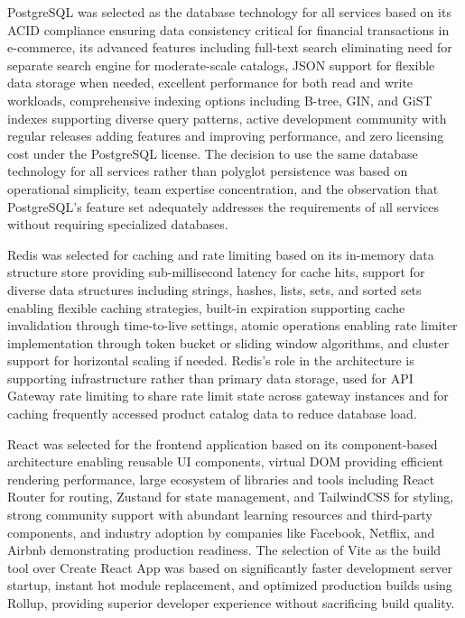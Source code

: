 PostgreSQL was selected as the database technology for all services based on its ACID compliance ensuring data consistency critical for financial transactions in e-commerce, its advanced features including full-text search eliminating need for separate search engine for moderate-scale catalogs, JSON support for flexible data storage when needed, excellent performance for both read and write workloads, comprehensive indexing options including B-tree, GIN, and GiST indexes supporting diverse query patterns, active development community with regular releases adding features and improving performance, and zero licensing cost under the PostgreSQL license. The decision to use the same database technology for all services rather than polyglot persistence was based on operational simplicity, team expertise concentration, and the observation that PostgreSQL's feature set adequately addresses the requirements of all services without requiring specialized databases.

Redis was selected for caching and rate limiting based on its in-memory data structure store providing sub-millisecond latency for cache hits, support for diverse data structures including strings, hashes, lists, sets, and sorted sets enabling flexible caching strategies, built-in expiration supporting cache invalidation through time-to-live settings, atomic operations enabling rate limiter implementation through token bucket or sliding window algorithms, and cluster support for horizontal scaling if needed. Redis's role in the architecture is supporting infrastructure rather than primary data storage, used for API Gateway rate limiting to share rate limit state across gateway instances and for caching frequently accessed product catalog data to reduce database load.

React was selected for the frontend application based on its component-based architecture enabling reusable UI components, virtual DOM providing efficient rendering performance, large ecosystem of libraries and tools including React Router for routing, Zustand for state management, and TailwindCSS for styling, strong community support with abundant learning resources and third-party components, and industry adoption by companies like Facebook, Netflix, and Airbnb demonstrating production readiness. The selection of Vite as the build tool over Create React App was based on significantly faster development server startup, instant hot module replacement, and optimized production builds using Rollup, providing superior developer experience without sacrificing build quality.

